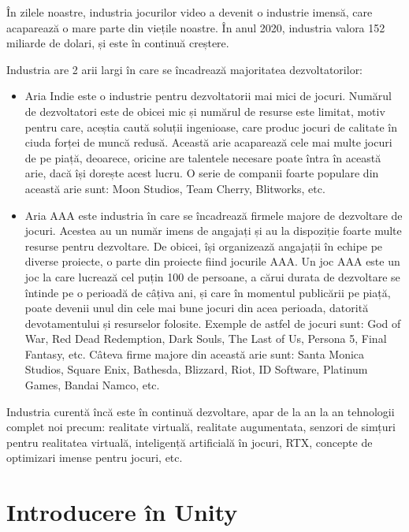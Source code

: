 \documentclass[12pt, a4paper]{article}
\begin{document}
	În zilele noastre, industria jocurilor video a devenit o industrie imensă, care acaparează o mare parte din viețile noastre. În anul 2020, industria valora 152 miliarde de dolari, și este în continuă creștere.
	\newline
	
	Industria are 2 arii largi în care se încadrează majoritatea dezvoltatorilor:
	
	\begin{itemize}
		\item Aria Indie este o industrie pentru dezvoltatorii mai mici de jocuri. Numărul de dezvoltatori este de obicei mic și numărul de resurse este limitat, motiv pentru care, aceștia caută soluții ingenioase, care produc jocuri de calitate în ciuda forței de muncă redusă. Această arie acaparează cele mai multe jocuri de pe piață, deoarece, oricine are talentele necesare poate întra în această arie, dacă își dorește acest lucru. O serie de companii foarte populare din această arie sunt: Moon Studios, Team Cherry, Blitworks, etc.
		\item Aria AAA este industria în care se încadrează firmele majore de dezvoltare de jocuri. Acestea au un număr imens de angajați și au la dispoziție foarte multe resurse pentru dezvoltare. De obicei, își organizează angajații în echipe pe diverse proiecte, o parte din proiecte fiind jocurile AAA. Un joc AAA este un joc la care lucrează cel puțin 100 de persoane, a cărui durata de dezvoltare se întinde pe o perioadă de câțiva ani, și care în momentul publicării pe piață, poate devenii unul din cele mai bune jocuri din acea perioada, datorită devotamentului și resurselor folosite. Exemple de astfel de jocuri sunt: God of War, Red Dead Redemption, Dark Souls, The Last of Us, Persona 5, Final Fantasy, etc. Câteva firme majore din această arie sunt: Santa Monica Studios, Square Enix, Bathesda, Blizzard, Riot, ID Software, Platinum Games, Bandai Namco, etc.
	\end{itemize}
	
	Industria curentă încă este în continuă dezvoltare, apar de la an la an tehnologii complet noi precum: realitate virtuală, realitate augumentata, senzori de simțuri pentru realitatea virtuală, inteligență artificială în jocuri, RTX, concepte de optimizari imense pentru jocuri, etc.
	
	
	\section{Introducere în Unity}
	
\end{document}
